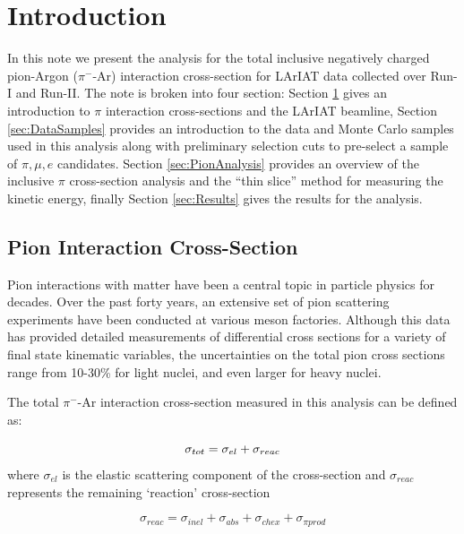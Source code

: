 \section{Introduction}\label{sec:Introduction}

In this note we present the analysis for the total inclusive negatively charged pion-Argon ($\pi^{-}$-Ar) interaction cross-section for LArIAT data collected over Run-I and Run-II. The note is broken into four section: Section \ref{sec:Introduction} gives an introduction to $\pi$ interaction cross-sections and the LArIAT beamline, Section \ref{sec:DataSamples} provides an introduction to the data and Monte Carlo samples used in this analysis along with preliminary selection cuts to pre-select a sample of $\pi, \mu, e$ candidates. Section \ref{sec:PionAnalysis} provides an overview of the inclusive $\pi$ cross-section analysis and the ``thin slice'' method for measuring the kinetic energy, finally Section \ref{sec:Results} gives the results for the analysis.

\subsection{Pion Interaction Cross-Section}\label{sec:PiCrossSection}
Pion interactions with matter have been a central topic in particle physics for decades. Over the past forty years, an extensive set of pion scattering experiments have been conducted at various meson factories. Although this data has provided detailed measurements of differential cross sections for a variety of final state kinematic variables, the uncertainties on the total pion cross sections range from 10-30\% for light nuclei, and even larger for heavy nuclei.

The total $\pi^{-}$-Ar interaction cross-section measured in this analysis can be defined as:

\begin{equation}
\sigma_{tot}= \sigma_{el}+\sigma_{reac}\\
\end{equation}
where $\sigma_{el}$ is the elastic scattering component of the cross-section and $\sigma_{reac}$ represents the remaining `reaction' cross-section

\begin{equation}
\sigma_{reac}=\sigma_{inel}+\sigma_{abs}+\sigma_{chex}+\sigma_{\pi prod}
\end{equation}

